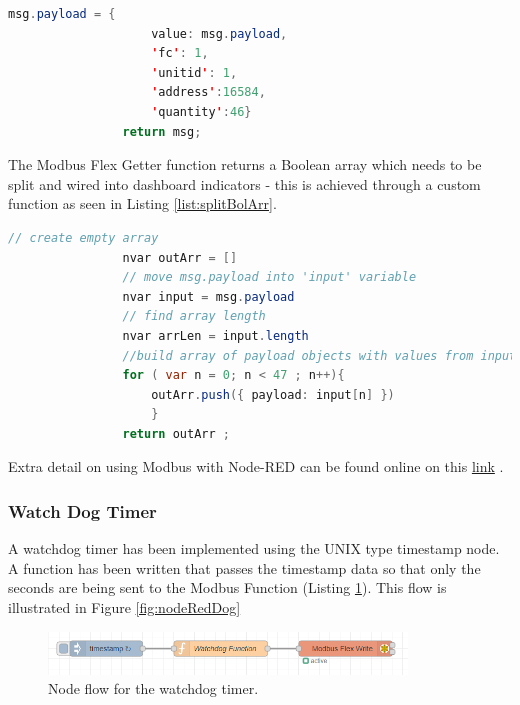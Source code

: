             \begin{lstlisting}[language=Java, caption = Configuration for Modbus Flex Getter, label=list:modGetCon]
                msg.payload = {
                    value: msg.payload,
                    'fc': 1,
                    'unitid': 1,
                    'address':16584,
                    'quantity':46}
                return msg;
            \end{lstlisting}
            
            The Modbus Flex Getter function returns a Boolean array which needs to be split and wired into dashboard indicators - this is achieved through a custom function as seen in Listing \ref{list:splitBolArr}.
            
            \begin{lstlisting}[language=Java, caption = Javascript to split Boolean array, label=list:splitBolArr]
                // create empty array 
                nvar outArr = []
                // move msg.payload into 'input' variable
                nvar input = msg.payload
                // find array length
                nvar arrLen = input.length
                //build array of payload objects with values from input
                for ( var n = 0; n < 47 ; n++){
                    outArr.push({ payload: input[n] })
                	}
                return outArr ;
            \end{lstlisting}
            
            
            Extra detail on using Modbus with Node-RED can be found online on this \href{https://stevesnoderedguide.com/node-red-modbus}{link} \cite{modbusNodeRed}.
            
        \subsubsection{Watch Dog Timer}
            A watchdog timer has been implemented using the UNIX type timestamp node. A function has been written that passes the timestamp data so that only the seconds are being sent to the Modbus Function (Listing \ref{fig:nodeRedWatchDogFlow}). This flow is illustrated in Figure \ref{fig:nodeRedDog}

            \begin{figure}[H]
                    \centering
                    \includegraphics[width = 0.85\textwidth]{2_images/nodeRedWatchDogFlow}
                    \caption{Node flow for the watchdog timer.}
                    \label{fig:nodeRedWatchDogFlow}
            \end{figure}  


